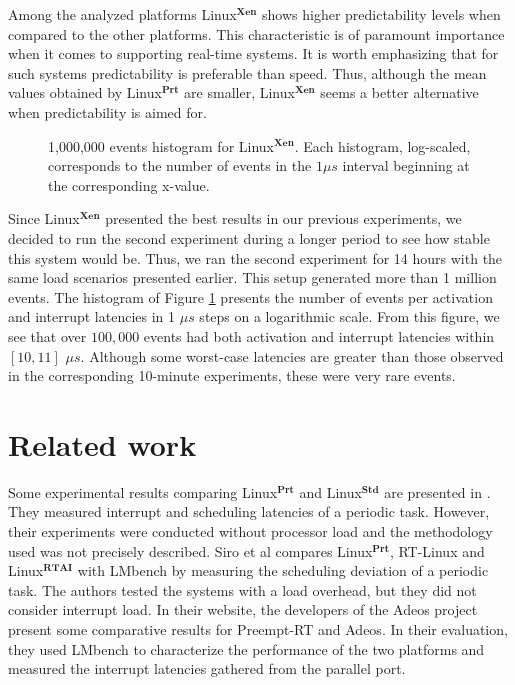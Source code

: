\documentclass{acm_proc_article-sp}
\newcommand{\preemptt}{{Preempt-RT }}
\begin{document}
Among the analyzed platforms Linux$^\mathbf{Xen}$ shows higher predictability levels
when compared to the other platforms. This characteristic is of paramount importance
when it comes to sup\-porting real-time systems.  It is worth emphasizing that for
such systems predictability is preferable than speed. Thus, although the mean values
obtained by Linux$^\mathbf{Prt}$ are smaller, Linux$^\mathbf{Xen}$ seems a better
alternative when predic\-tability is aimed for.

\begin{figure}[h!tb]%
 \centering
 \label{fig:histo}%
 {\scalebox{0.64}{}} \hspace{10pt}%
 \caption{1,000,000 events histogram for Linux$^\mathbf{Xen}$. Each histogram, log-scaled,
 corresponds to the number of events in the $1 \mu s$ interval beginning
 at the corresponding x-value.
}
\end{figure}

Since Linux$^\mathbf{Xen}$ presented the best results in our previous experiments,
we decided to run the second experiment during a longer period to see how stable
this system would be. Thus, we ran the second experiment for 14 hours with the same
load scenarios presented earlier. This setup generated more than 1 million events.
The histogram of Figure \ref{fig:histo} presents the number of events per activation
and interrupt latencies in 1 $\mu s$ steps on a logarithmic scale. From this figure,
we see that over $100,000$ events had both activation and interrupt latencies within
$[10, 11]$ $\mu s$. Although some worst-case latencies are greater than those
observed in the corresponding 10-minute experiments, these were very rare events.

\section{Related work}
\label{sec:trabRel}

Some experimental results comparing Linux$^{\mathbf{Prt}}$ and
Linux$^{\mathbf{Std}}$ are presented in \cite{Rostedt07}. They measured interrupt
and scheduling latencies of a periodic task. However, their experiments were
conducted without processor load and the methodology used was not precisely
described. Siro et al \cite{Siro07} compares Linux$^{\mathbf{Prt}}$, RT-Linux
\cite{Barabanov97} and Linux$^{\mathbf{RTAI}}$ \cite{Dozio03} with LMbench
\cite{McVoy96} by measuring the scheduling deviation of a periodic task. The authors
tested the systems with a load overhead, but they did not consider interrupt
load. In their website, the developers of the Adeos project \cite{Benoit05} present
some comparative results for \preemptt and Adeos. In their evaluation, they used
LMbench \cite{McVoy96} to characterize the performance of the two platforms and
measured the interrupt latencies gathered from the parallel port.
\end{document}
